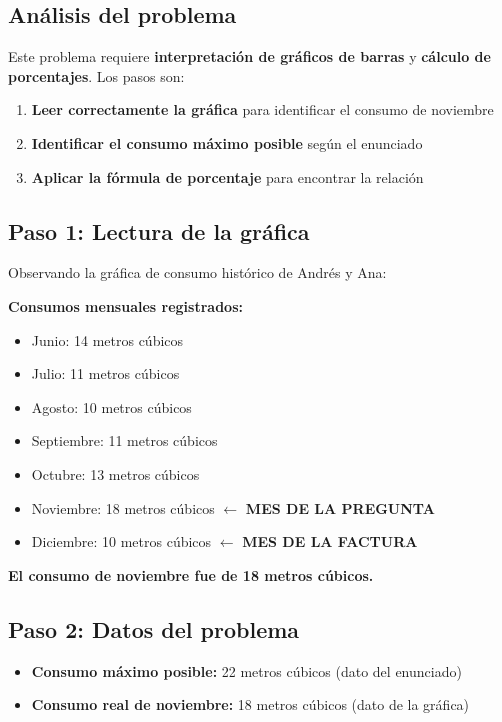 \documentclass[a4paper]{article}
\newenvironment{solution}{}{}
\begin{document}
\begin{solution}

\subsection*{Análisis del problema}

Este problema requiere \textbf{interpretación de gráficos de barras} y \textbf{cálculo de porcentajes}. Los pasos son:

\begin{enumerate}
\item \textbf{Leer correctamente la gráfica} para identificar el consumo de noviembre
\item \textbf{Identificar el consumo máximo posible} según el enunciado
\item \textbf{Aplicar la fórmula de porcentaje} para encontrar la relación
\end{enumerate}

\subsection*{Paso 1: Lectura de la gráfica}

Observando la gráfica de consumo histórico de Andrés y Ana:

\textbf{Consumos mensuales registrados:}\begin{itemize}\item Junio: 14 metros cúbicos
\item Julio: 11 metros cúbicos
\item Agosto: 10 metros cúbicos
\item Septiembre: 11 metros cúbicos
\item Octubre: 13 metros cúbicos
\item Noviembre: 18 metros cúbicos $\leftarrow$ \textbf{MES DE LA PREGUNTA}
\item Diciembre: 10 metros cúbicos $\leftarrow$ \textbf{MES DE LA FACTURA}\end{itemize}
\textbf{El consumo de noviembre fue de 18 metros cúbicos.}

\subsection*{Paso 2: Datos del problema}

\begin{itemize}
\item \textbf{Consumo máximo posible:} 22 metros cúbicos (dato del enunciado)
\item \textbf{Consumo real de noviembre:} 18 metros cúbicos (dato de la gráfica)
\end{itemize}


\end{solution}
\end{document}
